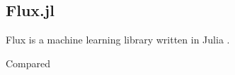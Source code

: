\subsection{Flux.jl}

Flux is a machine learning library written in Julia \cite{Innes2018}. 

Compared